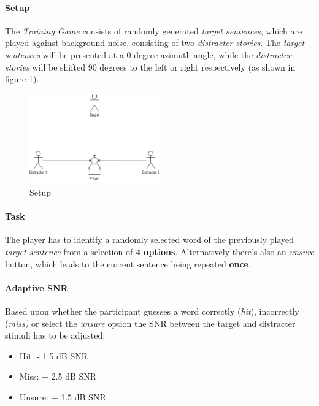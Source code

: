 \documentclass[a4paper,11pt]{article}%
\renewcommand{\\}{\vspace*{0.5\baselineskip} \newline}
\begin{document}
\paragraph{Setup} The \textit{Training Game} consists of randomly generated \textit{target sentences}, which are played against background noise, consisting of two \textit{distracter stories}. The \textit{target sentences} will be presented at a 0 degree azimuth angle, while the \textit{distracter stories} will be shifted 90 degrees to the left or right respectively (as shown in figure \ref{fig:setup}).
\vspace{5mm}
\begin{figure}[h!]
\centering
\includegraphics[width=0.5\textwidth]{setup2.png}
\caption{Setup}
\label{fig:setup}
\vspace{3mm}
\end{figure}


\paragraph{Task} The player has to identify a randomly selected word of the previously played \textit{target sentence} from a selection of \textbf{4 options}. Alternatively there's also an \textit{unsure} button, which leads to the current sentence being repeated \textbf{once}. 


\paragraph{Adaptive SNR} Based upon whether the participant guesses a word correctly (\textit{hit}), incorrectly (\textit{miss)} or select the \textit{unsure} option the \ac{SNR} between the target and distracter stimuli has to be adjusted:
\begin{itemize}
\item Hit: - 1.5 dB SNR
\item Miss: + 2.5 dB SNR
\item Unsure: + 1.5 dB SNR
\end{itemize}
\end{document}
